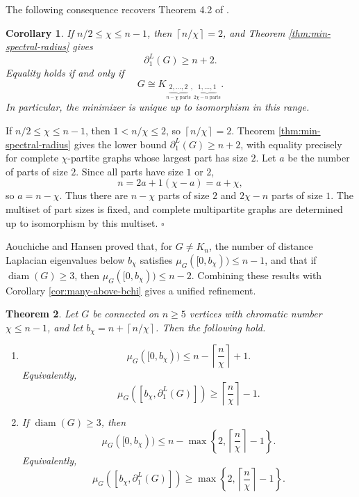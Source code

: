 \documentclass[12pt]{article}
\newcommand{\ceil}[1]{\left\lceil #1 \right\rceil}
\newcommand{\diam}{\operatorname{diam}}
\theoremstyle{plain}
\newtheorem{theorem}{Theorem}[section]
\newtheorem{corollary}[theorem]{Corollary}
\theoremstyle{definition}
\renewenvironment{proof}{{\noindent\bfseries Proof. }}{\hfill$\square$\par}
\begin{document}
\medskip
\noindent The following consequence recovers Theorem 4.2 of \cite{PirzadaKhan2021}.

\begin{corollary}\label{cor:recover-4-2}
If $n/2\le \chi\le n-1$, then $\ceil{n/\chi}=2$, and Theorem \ref{thm:min-spectral-radius} gives
\[
    \partial_1^L(G)\ge n+2.
\]
Equality holds if and only if
\[
    G\cong K_{\underbrace{2,
\dots,2}_{n-\chi\text{ parts}},\underbrace{1,
\dots,1}_{2\chi-n\text{ parts}}}.
\]
In particular, the minimizer is unique up to isomorphism in this range.
\end{corollary}

\begin{proof}
If $n/2\le\chi\le n-1$, then $1<n/\chi\le2$, so $\ceil{n/\chi}=2$. Theorem
\ref{thm:min-spectral-radius} gives the lower bound $\partial_1^L(G)\ge n+2$, with equality precisely for complete
$\chi$-partite graphs whose largest part has size $2$. Let $a$ be the number of parts of size $2$. Since all parts have size
$1$ or $2$,
\[
    n=2a+1(\chi-a)=a+\chi,
\]
so $a=n-\chi$. Thus there are $n-\chi$ parts of size $2$ and $2\chi-n$ parts of size $1$. The multiset of part sizes is fixed,
and complete multipartite graphs are determined up to isomorphism by this multiset.
\end{proof}

\medskip
\noindent  Aouchiche and Hansen \cite{AouchicheHansen2017} proved that, for $G\ne K_n$, the number of distance Laplacian eigenvalues below
$b_\chi$ satisfies $\mu_G([0,b_\chi))\le n-1$, and that if $\diam(G)\ge3$, then
$\mu_G([0,b_\chi))\le n-2$. Combining these results with Corollary \ref{cor:many-above-bchi} gives a unified refinement.

\begin{theorem}\label{thm:diameter-refine}
Let $G$ be connected on $n\ge5$ vertices with chromatic number $\chi\le n-1$, and let
$b_\chi=n+\ceil{n/\chi}$. Then the following hold.
\begin{enumerate}[label=\textup{(\alph*)}]
    \item
    \[
        \mu_G([0,b_\chi))\le n-\ceil{\frac{n}{\chi}}+1.
    \]
    Equivalently,
    \[
        \mu_G([b_\chi,\partial_1^L(G)])\ge \ceil{\frac{n}{\chi}}-1.
    \]
    \item If $\diam(G)\ge3$, then
    \[
        \mu_G([0,b_\chi))\le n-\max\left\{2,\ceil{\frac{n}{\chi}}-1\right\}.
    \]
    Equivalently,
    \[
        \mu_G([b_\chi,\partial_1^L(G)])
        \ge \max\left\{2,\ceil{\frac{n}{\chi}}-1\right\}.
    \]
\end{enumerate}
\end{theorem}
\end{document}
